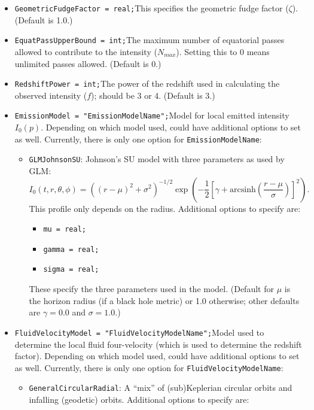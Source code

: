 \documentclass[11pt,a4paper]{article}
\newcommand{\be}{\begin{equation}}
\newcommand{\ee}{\end{equation}}
\newcommand{\code}[1]{{\tt #1}}
\begin{document}
\begin{itemize}
\begin{itemize}
\item \code{GeometricFudgeFactor = real;}\newline This specifies the geometric fudge factor ($\zeta$). (Default is 1.0.)
\item \code{EquatPassUpperBound = int;}\newline The maximum number of equatorial passes allowed to contribute to the intensity ($N_{max}$). Setting this to 0 means unlimited passes allowed. (Default is 0.)
\item \code{RedshiftPower = int;}\newline The power of the redshift used in calculating the observed intensity ($f$); should be 3 or 4. (Default is 3.)
\item \code{EmissionModel = "EmissionModelName";}\newline Model for local emitted intensity $I_0(p)$. Depending on which model used, could have additional options to set as well. Currently, there is only one option for \code{EmissionModelName}:
\begin{itemize}
\item \code{GLMJohnsonSU}: Johnson's SU model with three parameters as used by GLM: 
\be I_0(t,r,\theta,\phi) = \left( (r-\mu)^2+\sigma^2\right)^{-1/2}\exp\left( -\frac12 \left[ \gamma + \text{arcsinh}\left(\frac{r-\mu}{\sigma}\right)\right]^2\right).\ee
This profile only depends on the radius.
Additional options to specify are:
\begin{itemize}
\item \code{mu = real;}
\item \code{gamma = real;}
\item \code{sigma = real;}
\end{itemize}
These specify the three parameters used in the model. (Default for $\mu$ is the horizon radius (if a black hole metric) or 1.0 otherwise; other defaults are $\gamma = 0.0$ and $\sigma = 1.0$.)
\end{itemize}
\item \code{FluidVelocityModel = "FluidVelocityModelName";}\newline Model used to determine the local fluid four-velocity (which is used to determine the redshift factor). Depending on which model used, could have additional options to set as well. Currently, there is only one option for \code{FluidVelocityModelName}:
\begin{itemize}
\item \code{GeneralCircularRadial}: A ``mix'' of (sub)Keplerian circular orbits and infalling (geodetic) orbits. Additional options to specify are:

\end{itemize}
\end{itemize}
\end{itemize}
\end{document}
